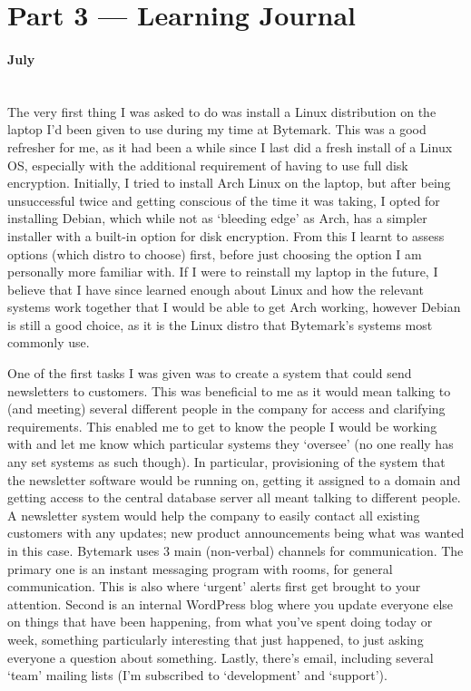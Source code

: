 \documentclass[12pt,a4paper]{article}
\newcommand{\paragraphnl}[1]{\paragraph{#1}\mbox{}\\}
\begin{document}
\section*{Part 3 --- Learning Journal}
\paragraphnl{July}
	The very first thing I was asked to do was install a Linux distribution on
	the laptop I'd been given to use during my time at Bytemark. This was a
	good refresher for me, as it had been a while since I last did a fresh
	install of a Linux OS, especially with the additional requirement of having
	to use full disk encryption. Initially, I tried to install Arch Linux on
	the laptop, but after being unsuccessful twice and getting conscious of the
	time it was taking, I opted for installing Debian, which while not as
	`bleeding edge' as Arch, has a simpler installer with a built-in option for
	disk encryption. From this I learnt to assess options (which distro to
	choose) first, before just choosing the option I am personally more
	familiar with. If I were to reinstall my laptop in the future, I believe
	that I have since learned enough about Linux and how the relevant systems
	work together that I would be able to get Arch working, however Debian is
	still a good choice, as it is the Linux distro that Bytemark's systems most
	commonly use.

	One of the first tasks I was given was to create a system that could send
	newsletters to customers. This was beneficial to me as it would mean
	talking to (and meeting) several different people in the company for access
	and clarifying requirements. This enabled me to get to know the people I
	would be working with and let me know which particular systems they
	`oversee' (no one really has any set systems as such though). In
	particular, provisioning of the system that the newsletter software would
	be running on, getting it assigned to a domain and getting access to the
	central database server all meant talking to different people. A newsletter
	system would help the company to easily contact all existing customers with
	any updates; new product announcements being what was wanted in this case.
	Bytemark uses 3 main (non-verbal) channels for communication. The primary
	one is an instant messaging program with rooms, for general communication.
	This is also where `urgent' alerts first get brought to your attention.
	Second is an internal WordPress blog where you update everyone else on
	things that have been happening, from what you've spent doing today or
	week, something particularly interesting that just happened, to just asking
	everyone a question about something. Lastly, there's email, including
	several `team' mailing lists (I'm subscribed to `development' and
	`support').
\end{document}

